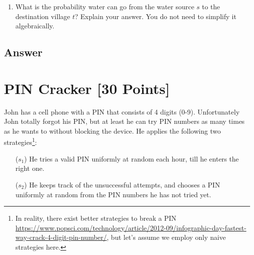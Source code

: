 \begin{tcolorbox}
	\begin{enumerate}
		\item What is the probability water can go from the water source $s$ to the destination village $t$? Explain your answer. You do not need to simplify it algebraically.
	\end{enumerate}
\end{tcolorbox}

\subsection{Answer}

\newpage 

\section{PIN Cracker [30 Points] } 
John has a cell phone with a PIN that consists of 4 digits (0-9). Unfortunately John totally forgot his PIN, but at least he can try PIN numbers as many times as he wants to without blocking the device.  He applies the following two strategies\footnote{In reality, there exist better strategies to break a PIN \url{https://www.popsci.com/technology/article/2012-09/infographic-day-fastest-way-crack-4-digit-pin-number/}, but let's assume we employ only naive strategies here.}:

\begin{itemize}
    \item[($s_1$)] He tries a valid PIN uniformly at random each hour, till he enters the right one.
    \item[($s_2$)] He keeps track of the unsuccessful attempts, and chooses a PIN uniformly at random from the PIN numbers he has not tried yet. 
\end{itemize}

